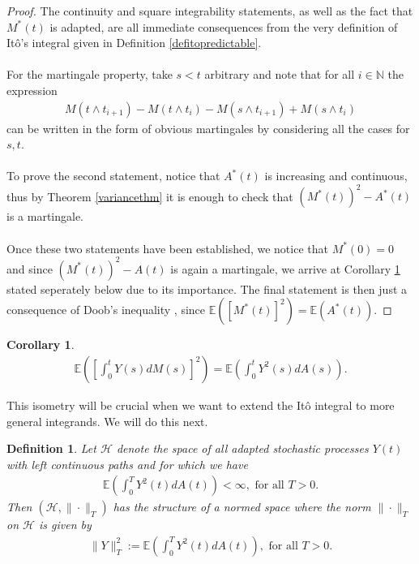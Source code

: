 \documentclass[11pt,a4paper, final]{article}
\newtheorem{cor}{Corollary}[thm]
\newtheorem{defn}{Definition}[section]
\begin{document}
\begin{proof}
The continuity and square integrability statements, as well as the fact that $M^*(t)$ is adapted, are all immediate consequences from the very definition of Itô's integral given in Definition \ref{defitopredictable}.
\\\\
For the martingale property, take $s < t$ arbitrary and note that for all $i \in \mathbb{N}$ the expression
\begin{align*}
M(t \wedge t_{i+1}) - M(t \wedge t_i) - M (s \wedge t_{i+1}) + M( s \wedge t_i)
\end{align*}
can be written in the form of obvious martingales by considering all the cases for $s,t$. 
\\\\
To prove the second statement, notice that $A^*(t)$ is increasing and continuous, thus by Theorem \ref{variancethm} it is enough to check that $(M^*(t))^2 - A^*(t)$ is a martingale. 
\\\\
Once these two statements have been established, we notice that $M^*(0)=0$ and since $(M^*(t))^2-A(t)$ is again a martingale, we arrive at Corollary \ref{corisometry} stated seperately below due to its importance. The final statement is then just a consequence of Doob's inequality \cite[Theorem A.42 \& Remark after 5.10 p.~198]{Liggett}, since $ \mathbb{E}([M^*(t)]^2) = \mathbb{E}(A^*(t))$. 
\end{proof}
\begin{cor} \label{corisometry} \begin{align*}
\mathbb{E} \left( \left[ \int_0^t Y(s) dM(s) \right]^2\right) = \mathbb{E} \left( \int_0^t Y^2(s) dA(s) \right).
\end{align*}
\end{cor}
\noindent This isometry will be crucial when we want to extend the Itô integral to more general integrands. We will do this next.
\newpage
\begin{defn} Let $\mathcal{H}$ denote the space of all adapted stochastic processes $Y(t)$ with left continuous paths and for which we have
\begin{align*}
\mathbb{E} \left( \int_0^T Y^2(t) dA(t) \right) < \infty, \text{ for all } T >0.
\end{align*}
Then $( \mathcal{H}, \| \cdot \|_T )$ has the structure of a normed space where the norm $\| \cdot \|_T$ on $\mathcal{H}$ is given by 
\begin{align*}
\| Y\|_T^2 := \mathbb{E} \left( \int_0^T Y^2(t) dA(t) \right), \text{ for all } T >0.
\end{align*}
\end{defn}
\end{document}

